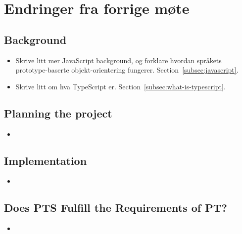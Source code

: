 
\chapter*{Endringer fra forrige møte}

\section*{Background}

\begin{itemize}
    \item Skrive litt mer JavaScript background, og forklare hvordan språkets prototype-baserte objekt-orientering fungerer.
    Section~\vref{subsec:javascript}.
    \item Skrive litt om hva TypeScript er.
    Section~\vref{subsec:what-is-typescript}.
\end{itemize}

\section*{Planning the project}

\begin{itemize}
    \item
\end{itemize}

\section*{Implementation}

\begin{itemize}
    \item
\end{itemize}

\section*{Does PTS Fulfill the Requirements of PT?}

\begin{itemize}
    \item
\end{itemize}
